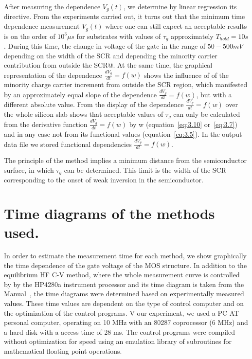 After measuring the dependence $V_{g}(t)$, we determine by linear
regression its directive. From the experiments carried out, it turns
out that the minimum time dependence measurement $V_{g}(t)$ where one
can still expect an acceptable results is on the order of
$10^{3}\mu{s}$ for substrates with values of $\tau_g$ approximately
$T_{hold}=10s$. During this time, the change in voltage of the gate in
the range of $50-500 mV$ depending on the width of the SCR and
depending the minority carrier contribution from outside the SCR@. At
the same time, the graphical representation of the dependence
$\frac{dV_g}{dt}=f(w)$ shows the influence of of the minority charge
carrier increment from outside the SCR region, which manifested by an
approximately equal slope of the dependence $\frac{dV_g}{dt}=f(w)$,
but with a different absolute value. From the display of the
dependence $\frac{dV_g}{dt}=f(w)$ over the whole silicon slab shows
that acceptable values of $\tau_{g}$ can only be calculated from the
derivative function $\frac{dV_g}{dt}=f(w)$ by w
(equation~\ref{eq:3.10} or~\ref{eq:3.7}) and in any case not from its
functional values (equation~\ref{eq:3.5}). In the output data file we
stored functional dependencies $\frac{dV_g}{dt}=f(w)$.

The principle of the method implies a minimum distance from the
semiconductor surface, in which $\tau_{g}$ can be determined. This
limit is the width of the SCR corresponding to the onset of weak
inversion in the semiconductor.

\section{Time diagrams of the methods used.}\label{sec:5.4}

In order to estimate the measurement time for each method, we show
graphically the time dependence of the gate voltage of the MOS
structure. In addition to the equilibrium HF C-V method, where the
whole measurement curve is controlled by by the HP4280a instrument
processor and its time diagram is taken from the Manual~\cite{5.7},
the time diagrams were determined based on experimentally measured
values. These time values are dependent on the type of control
computer and on the optimization of the control programs. V our
experiment, we used a PC AT personal computer, operating on 10 MHz
with an 80287 coprocessor (6 MHz) and a hard disk with a access time
of 28 ms. The control programs were compiled without optimization for
speed using an emulation library of subroutines for mathematical
floating point operations.

